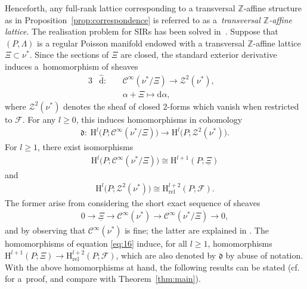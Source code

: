 \documentclass[pdftex]{sigma}
\numberwithin{equation}{section}
\newcommand{\de}{\mathrm{d}} %
\newcommand{\PM}{(P,\Lambda)} %
\newcommand{\HH}{\mathrm{H}}
\newcommand{\ZZ}{\mathbb{Z}}
\begin{document}
Henceforth, any full-rank lattice corresponding to a transversal $\ZZ$-af\/f\/ine structure as in Proposition~\ref{prop:correspondence} is referred to as a~{\it transversal $\ZZ$-affine lattice}. The realisation problem for SIRs has been solved in~\cite{dd}. Suppose that $\PM$ is a regular Poisson manifold endowed with a transversal $\ZZ$-af\/f\/ine lattice $\Xi \subset \nu^*$. Since the sections of $\Xi$ are closed, the standard exterior derivative induces a~homomorphism of sheaves
\begin{alignat*}{3}
 & \hat{\de} \colon \ && \mathcal{C}^{\infty}\left(\nu^* /\Xi \right) \to \mathcal{Z}^2(\nu^*), & \\
 &&& \alpha + \Xi \mapsto \de \alpha,&
\end{alignat*}
where $\mathcal{Z}^2(\nu^*)$ denotes the sheaf of closed 2-forms which vanish when restricted to $\mathcal{F}$. For any $l \geq 0$, this induces homomorphisms in cohomology
\begin{gather} \label{eq:16}
 \mathfrak{d}\colon \ \HH^l\big(P;\mathcal{C}^{\infty} (\nu^* /\Xi )\big) \to \HH^l\big(P;\mathcal{Z}^2(\nu^*)\big).
\end{gather}
For $l \geq 1$, there exist isomorphisms
\begin{gather*}
 \HH^l\big(P;\mathcal{C}^{\infty} (\nu^* /\Xi )\big) \cong \HH^{l+1} (P;\underline{\Xi} )
\end{gather*}
and
\begin{gather*}
 \HH^l\big(P;\mathcal{Z}^2(\nu^*)\big) \cong \HH_{\mathrm{rel}}^{l+2}(P;\mathcal{F}).
\end{gather*}
The former arise from considering the short exact sequence of sheaves
\begin{gather*} %
 0 \to \underline{\Xi} \to \mathcal{C}^{\infty}(\nu^*) \to \mathcal{C}^{\infty}(\nu^*/\Xi) \to 0,
\end{gather*}
and by observing that $\mathcal{C}^{\infty}(\nu^*)$ is f\/ine; the latter are explained in \cite[Section~4, Part~(a)]{dd}. The homomorphisms of equation \eqref{eq:16} induce, for all $l \geq 1$, homomorphisms $\HH^{l+1}(P;\Xi) \to \HH^{l+2}_{\mathrm{rel}}(P;\mathcal{F})$, which are also denoted by $\mathfrak{d}$ by abuse of notation. With the above homomorphisms at hand, the following results can be stated (cf.\ \cite[Theorems~4.2 and~4.3]{dd} for a~proof, and compare with Theorem~\ref{thm:main}).
\end{document}
